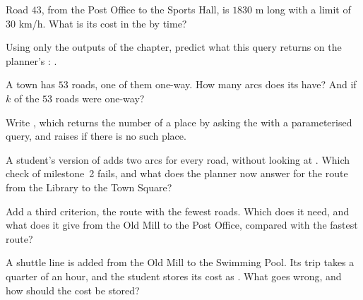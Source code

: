 \begin{exercise}[$\star$]\label{exo:g12:project-route-planner:2}
Road $43$, from the Post Office to the Sports Hall, is $1830$ m long with a limit of $30$ km/h. What is its cost in
the  by time?
\end{exercise}

\begin{exercise}[$\star$]\label{exo:g12:project-route-planner:3}
Using only the outputs of the chapter, predict what this query returns on the planner's :
.
\end{exercise}

\begin{exercise}[$\star$]\label{exo:g12:project-route-planner:4}
A town has $53$ roads, one of them one-way. How many arcs does its  have? And if $k$ of the $53$ roads were
one-way?
\end{exercise}

\begin{exercise}[$\star$]\label{exo:g12:project-route-planner:5}
Write , which returns the number of a place by asking the  with a parameterised
query, and raises  if there is no such place.
\end{exercise}

\begin{exercise}[$\star\star$]\label{exo:g12:project-route-planner:6}
A student's version of  adds two arcs for every road, without looking at . Which
check of milestone~2 fails, and what does the planner now answer for the route from the Library to the Town Square?
\end{exercise}

\begin{exercise}[$\star\star$]\label{exo:g12:project-route-planner:7}
Add a third criterion, the route with the fewest roads. Which  does it need, and what does it give from the Old
Mill to the Post Office, compared with the fastest route?
\end{exercise}

\begin{exercise}[$\star\star$]\label{exo:g12:project-route-planner:8}
A shuttle line is added from the Old Mill to the Swimming Pool. Its trip takes a quarter of an hour, and
the student stores its cost as . What goes wrong, and how should the cost be stored?
\end{exercise}

